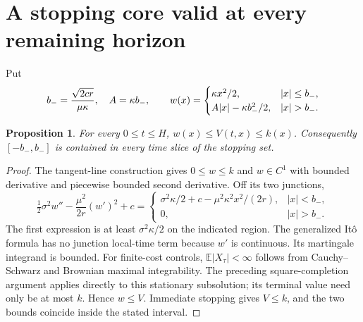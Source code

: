 \documentclass[11pt]{article}
\newtheorem{proposition}[theorem]{Proposition}
\theoremstyle{definition}
\begin{document}
\section*{A stopping core valid at every remaining horizon}
Put
\[
 b_-={\sqrt{2cr}\over\mu\kappa},\quad
 A=\kappa b_-,\qquad
 w(x)=\begin{cases}\kappa x^2/2,&|x|\le b_-,\\
 A|x|-\kappa b_-^2/2,&|x|>b_-.
 \end{cases}
\]
\begin{proposition}
For every $0\le t\le H$,
$w(x)\le V(t,x)\le k(x)$. Consequently $[-b_-,b_-]$ is contained in
 every time slice of the stopping set.
\end{proposition}
\begin{proof}
The tangent-line construction gives $0\le w\le k$ and $w\in C^1$ with
bounded derivative and piecewise bounded second derivative. Off its two
junctions,
\[
 \tfrac12\sigma^2w''-\frac{\mu^2}{2r}(w')^2+c
 =\begin{cases}\sigma^2\kappa/2+c-\mu^2\kappa^2x^2/(2r),&|x|<b_-,\\
 0,&|x|>b_-.
 \end{cases}
\]
The first expression is at least $\sigma^2\kappa/2$ on the indicated region.
The generalized It\^o formula has no junction local-time term because $w'$
is continuous. Its martingale integrand is bounded. For finite-cost controls,
$\mathbb E|X_\tau|<\infty$ follows from Cauchy--Schwarz and Brownian
maximal integrability. The preceding square-completion argument applies
directly to this stationary subsolution; its terminal value need only be
at most $k$. Hence $w\le V$. Immediate stopping gives $V\le k$, and the
two bounds coincide inside the stated interval.
\end{proof}
\end{document}
